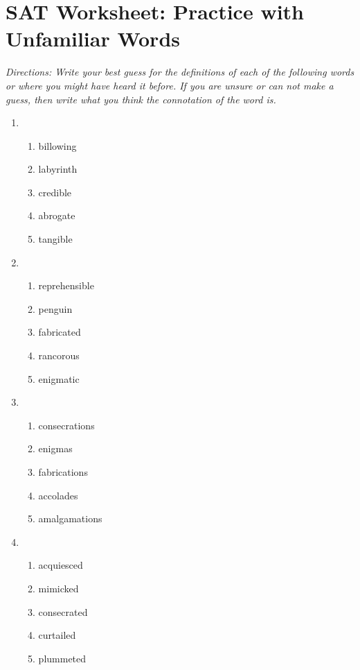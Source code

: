 \section{SAT Worksheet: Practice with Unfamiliar Words}

\textit{Directions: Write your best guess for the definitions of each of the following words or where you might have heard it before. If you are unsure or can not make a guess, then write what you think the connotation of the word is.} 


\begin{enumerate}

\item   
\begin{enumerate}[label=(\Alph*)]
\item billowing  \hrulefill
\item labyrinth \hrulefill
\item credible \hrulefill
\item abrogate \hrulefill
\item tangible \hrulefill
\end{enumerate}

\item    
\begin{enumerate}[label=(\Alph*)] 
\item reprehensible \hrulefill
\item penguin  \hrulefill
\item fabricated \hrulefill
\item rancorous \hrulefill
\item enigmatic   \hrulefill
\end{enumerate}

\item 
\begin{enumerate} [label=(\Alph*)]
\item consecrations \hrulefill
\item enigmas \hrulefill
\item fabrications \hrulefill
\item accolades \hrulefill
\item amalgamations  \hrulefill
\end{enumerate}

\item 
\begin{enumerate} [label=(\Alph*)]
\item acquiesced \hrulefill
\item mimicked  \hrulefill
\item consecrated \hrulefill
\item curtailed \hrulefill
\item plummeted \hrulefill
\end{enumerate}
\end{enumerate}